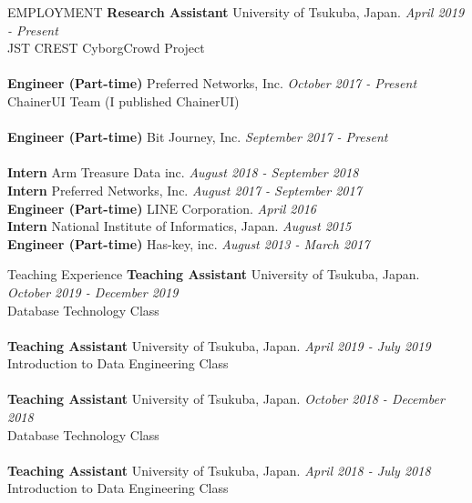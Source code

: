 \documentclass{resume} %
\begin{document}
\begin{rSection}{EMPLOYMENT}
{\bf Research Assistant} University of Tsukuba, Japan. \hfill {\em April 2019 - Present}
\\ JST CREST CyborgCrowd Project
\\\\
{\bf Engineer (Part-time) } Preferred Networks, Inc. \hfill {\em October 2017 - Present}
\\ ChainerUI Team (I published ChainerUI)
\\\\
{\bf Engineer (Part-time) } Bit Journey, Inc. \hfill {\em September 2017 - Present} 
\\\\
{\bf Intern } Arm Treasure Data inc. \hfill {\em August 2018 - September 2018}
\\
{\bf Intern } Preferred Networks, Inc. \hfill {\em August 2017 - September 2017} 
\\
{\bf Engineer (Part-time) } LINE Corporation. \hfill {\em April 2016}
\\
{\bf Intern } National Institute of Informatics, Japan. \hfill {\em August 2015}
\\
{\bf Engineer (Part-time) } Has-key, inc. \hfill {\em August 2013 - March 2017}
\end{rSection}



\begin{rSection}{Teaching Experience}
{\bf Teaching Assistant } University of Tsukuba, Japan. \hfill {\em October 2019 - December 2019}
\\ Database Technology Class
\\\\
{\bf Teaching Assistant } University of Tsukuba, Japan. \hfill {\em April 2019 - July 2019}
\\ Introduction to Data Engineering Class
\\\\
{\bf Teaching Assistant } University of Tsukuba, Japan. \hfill {\em October 2018 - December 2018}
\\ Database Technology Class
\\\\
{\bf Teaching Assistant } University of Tsukuba, Japan. \hfill {\em April 2018 - July 2018}
\\ Introduction to Data Engineering Class
\end{rSection}
\end{document}

